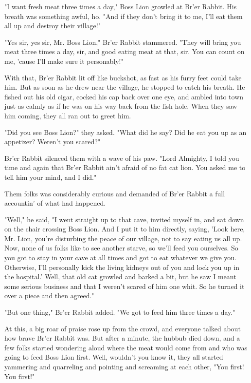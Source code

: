 "I want fresh meat three times a day," Boss Lion growled at Br'er Rabbit. His breath was something awful, ho. "And if they don't bring it to me, I'll eat them all up and destroy their village!"

"Yes sir, yes sir, Mr. Boss Lion," Br'er Rabbit stammered. "They will bring you meat three times a day, sir, and good eating meat at that, sir. You can count on me, 'cause I'll make sure it personably!"

With that, Br'er Rabbit lit off like buckshot, as fast as his furry feet could take him. But as soon as he drew near the village, he stopped to catch his breath. He fished out his old cigar, cocked his cap back over one eye, and ambled into town just as calmly as if he was on his way back from the fish hole. When they saw him coming, they all ran out to greet him.

"Did you see Boss Lion?" they asked. "What did he say? Did he eat you up as an appetizer? Weren't you scared?"

Br'er Rabbit silenced them with a wave of his paw. "Lord Almighty, I told you time and again that Br'er Rabbit ain't afraid of no fat cat lion. You asked me to tell him your mind, and I did."

Them folks was considerably curious and demanded of Br'er Rabbit a full accountin' of what had happened.

"Well," he said, "I went straight up to that cave, invited myself in, and sat down on the chair crossing Boss Lion. And I put it to him directly, saying, 'Look here, Mr. Lion, you're disturbing the peace of our village, not to say eating us all up. Now, none of us folks like to see another starve, so we'll feed you ourselves. So you got to stay in your cave at all times and got to eat whatever we give you. Otherwise, I'll personally kick the living kidneys out of you and lock you up in the hospital.' Well, that old cat growled and barked a bit, but he saw I meant some serious business and that I weren't scared of him one whit. So he turned it over a piece and then agreed."

"But one thing," Br'er Rabbit added. "We got to feed him three times a day."

At this, a big roar of praise rose up from the crowd, and everyone talked about how brave Br'er Rabbit was. But after a minute, the hubbub died down, and a few folks started wondering aloud where the meat would come from and who was going to feed Boss Lion first. Well, wouldn't you know it, they all started yammering and quarreling and pointing and screaming at each other, "You first! You first!"

